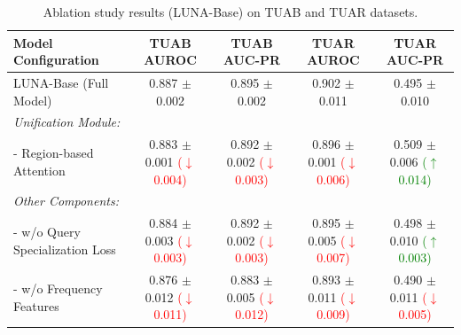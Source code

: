 \begin{table}[htbp!]
    \centering
    \vspace{-0.4cm}
   \caption{Ablation study results (LUNA-Base) on TUAB and TUAR datasets.}
    \label{tab:ablation}
    \scriptsize
    \setlength{\tabcolsep}{2pt}
    \begin{tabular}{@{}lcccc@{}}
        \toprule
        \textbf{Model Configuration} & \textbf{TUAB AUROC} & \textbf{TUAB AUC-PR} & \textbf{TUAR AUROC} & \textbf{TUAR AUC-PR} \\
        \midrule  
        LUNA-Base (Full Model) & 0.887 $\pm$ 0.002 & 0.895 $\pm$ 0.002 & 0.902 $\pm$ 0.011 & 0.495 $\pm$ 0.010 \\
        \midrule
        \textit{Unification Module:} \\
        \quad - Region-based Attention  & 0.883 $\pm$ 0.001 \textcolor{red}{($\downarrow$ 0.004)} & 0.892 $\pm$ 0.002 \textcolor{red}{($\downarrow$ 0.003)} & 0.896 $\pm$ 0.001 \textcolor{red}{($\downarrow$ 0.006)} & 0.509 $\pm$ 0.006 \textcolor{green}{($\uparrow$ 0.014)} \\
        \midrule
        \textit{Other Components:} \\
        \quad - w/o Query Specialization Loss & 0.884 $\pm$ 0.003 \textcolor{red}{($\downarrow$ 0.003)} & 0.892 $\pm$ 0.002 \textcolor{red}{($\downarrow$ 0.003)} & 0.895 $\pm$ 0.005 \textcolor{red}{($\downarrow$ 0.007)} & 0.498 $\pm$ 0.010 \textcolor{green}{($\uparrow$ 0.003)} \\

        \quad - w/o Frequency Features & 0.876 $\pm$ 0.012 \textcolor{red}{($\downarrow$ 0.011)} & 0.883 $\pm$ 0.005 \textcolor{red}{($\downarrow$ 0.012)} & 0.893 $\pm$ 0.011 \textcolor{red}{($\downarrow$ 0.009)} & 0.490 $\pm$ 0.011 \textcolor{red}{($\downarrow$ 0.005)} \\
        \bottomrule
    \end{tabular}
    \vspace{-0.4cm}
\end{table}